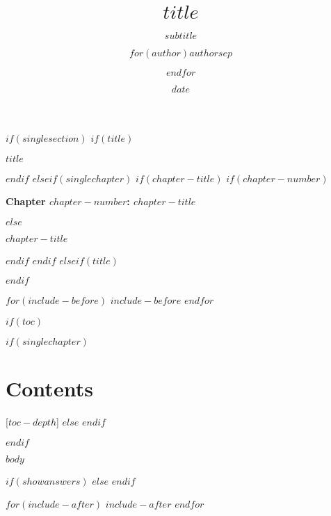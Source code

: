 \documentclass[11pt]{article}
\title{$title$}
\subtitle{$subtitle$}
\author{$for(author)$$author$$sep$ \and $endfor$}
\date{$date$}
\begin{document}
$if(singlesection)$
$if(title)$
{\centering\LARGE\bfseries $title$ \par\bigskip}
$endif$
$elseif(singlechapter)$
$if(chapter-title)$
$if(chapter-number)$
{\centering\Huge\bfseries Chapter $chapter-number$: $chapter-title$ \par\bigskip}
$else$
{\noindent\Huge\bfseries $chapter-title$ \par\bigskip}
$endif$
$endif$
$elseif(title)$
\maketitle
$endif$

$for(include-before)$
$include-before$
$endfor$

$if(toc)$
{
$if(singlechapter)$
\section*{Contents}
\startcontents
{}[$toc-depth$]{}
$else$
\setcounter{tocdepth}{$toc-depth$}
\tableofcontents
$endif$
}
$endif$

$body$

$if(showanswers)$
$else$
$endif$

$for(include-after)$
$include-after$
$endfor$
\end{document}
